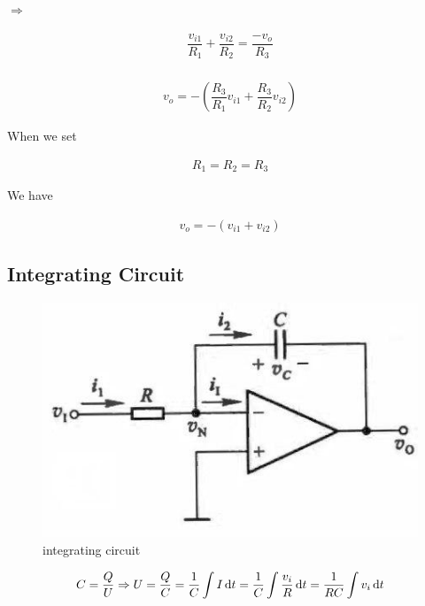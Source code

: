 $\Rightarrow$

\begin{equation*}
  \begin{aligned}
    \dfrac{v_{i1}}{R_1} + \dfrac{v_{i2}}{R_2} = \dfrac{- v_o}{R_3} \\
  \end{aligned}
\end{equation*}

\begin{equation*}
  \begin{aligned}
    v_o = - \left( \dfrac{R_3}{R_1} v_{i1} + \dfrac{R_3}{R_2} v_{i2} \right) 
  \end{aligned}
\end{equation*}

When we set

\begin{equation*}
  \begin{aligned}
    R_1 = R_2 = R_3
  \end{aligned}
\end{equation*}

We have

\begin{equation*}
  \begin{aligned}
    v_o = - \left( v_{i1} + v_{i2} \right)
  \end{aligned}
\end{equation*}

\subsection{Integrating Circuit}

\begin{figure}[H]
  \centering
  \includegraphics[width=0.4\linewidth]{figures/integrating-circuit}
  \caption{integrating circuit}
  \label{fig:}
\end{figure}

\begin{equation*}
  \begin{aligned}
    C = \dfrac{Q}{U} \Rightarrow U = \dfrac{Q}{C} = \dfrac{1}{C} \int I \mathop{}\!\mathrm{d} t = \dfrac{1}{C} \int \dfrac{v_i}{R} \mathop{}\!\mathrm{d} t = \dfrac{1}{RC} \int v_i \mathop{}\!\mathrm{d} t
  \end{aligned}
\end{equation*}

